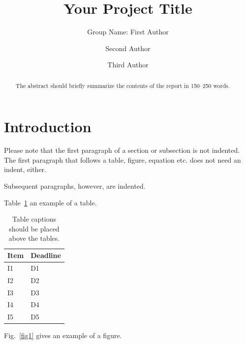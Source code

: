 \documentclass[runningheads]{llncs}
\begin{document}
%
\title{Your Project Title}

\author{Group Name: First Author \and
Second Author \and
Third Author}

%
\maketitle              %
%
\begin{abstract}
The abstract should briefly summarize the contents of the report in
150--250 words.

\end{abstract}
%
%
%
\section{Introduction}
Please note that the first paragraph of a section or subsection is
not indented. The first paragraph that follows a table, figure,
equation etc. does not need an indent, either.

Subsequent paragraphs, however, are indented.

Table~\ref{tab1} an example of a table.

\begin{table}
\caption{Table captions should be placed above the
tables.}\label{tab1}
\begin{tabular}{|l|l|}
\hline
Item & Deadline \\
\hline
I1 & D1 \\
I2 & D2 \\
I3 & D3 \\
I4 & D4 \\
I5 & D5 \\
\hline
\end{tabular}
\end{table}

Fig.~\ref{fig1} gives an example of a figure.
\end{document}
